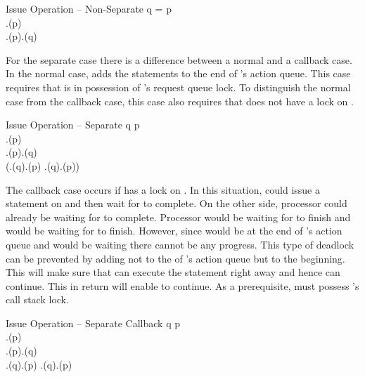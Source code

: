 \singlelineinferencerule
	{Issue Operation -- Non-Separate}
	{
		q = p \\
		\neg \state.\arelockspassedfeature(p) \\
		\state.\callstacklocksfeature(p).\containsfeature(q)
	}
	{}
	{}
 
For the separate case there is a difference between a normal and a callback case. In the normal case,  adds the statements to the end of 's action queue. This case requires that  is in possession of 's request queue lock. To distinguish the normal case from the callback case, this case also requires that  does not have a lock on .

\singlelineinferencerule
	{Issue Operation -- Separate}
	{
		q \neq p \\
		\neg \state.\arelockspassedfeature(p) \\
		\state.\requestqueuelocksfeature(p).\containsfeature(q) \\
		\neg (\state.\requestqueuelocksfeature(q).\containsfeature(p) \vee \state.\callstacklocksfeature(q).\containsfeature(p))
	}
	{}
	{}
 
The callback case occurs if  has a lock on . In this situation,  could issue a statement  on  and then wait for  to complete. On the other side, processor  could already be waiting for  to complete. Processor  would be waiting for  to finish and  would be waiting for  to finish. However, since  would be at the end of 's action queue and  would be waiting there cannot be any progress. This type of deadlock can be prevented by adding  not to the of 's action queue but to the beginning. This will make sure that  can execute the statement right away and hence  can continue. This in return will enable  to continue. As a prerequisite,  must possess 's call stack lock.

\singlelineinferencerule
	{Issue Operation -- Separate Callback}
	{
		q \neq p \\
		\neg \state.\arelockspassedfeature(p) \\
		\state.\callstacklocksfeature(p).\containsfeature(q) \\
		\state.\requestqueuelocksfeature(q).\containsfeature(p) \vee \state.\callstacklocksfeature(q).\containsfeature(p)
	}
	{}
	{}
 
